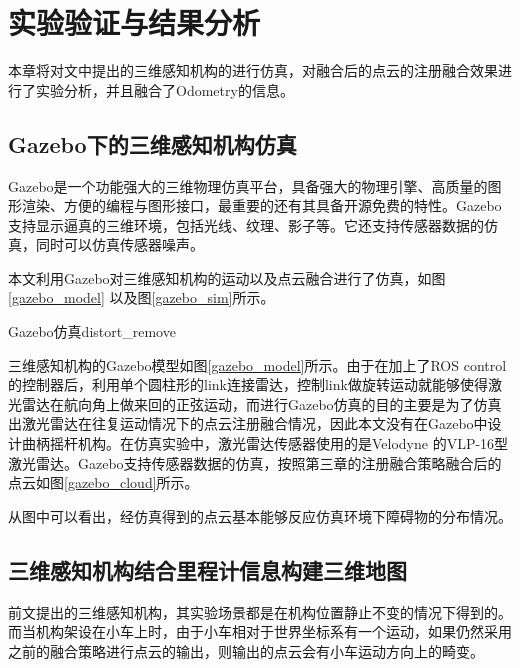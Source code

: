 
\chapter{实验验证与结果分析}
本章将对文中提出的三维感知机构的进行仿真，对融合后的点云的注册融合效果进行了实验分析，并且融合了Odometry的信息。

\section{Gazebo下的三维感知机构仿真}

Gazebo是一个功能强大的三维物理仿真平台，具备强大的物理引擎、高质量的图形渲染、方便的编程与图形接口，最重要的还有其具备开源免费的特性。Gazebo支持显示逼真的三维环境，包括光线、纹理、影子等。它还支持传感器数据的仿真，同时可以仿真传感器噪声。

本文利用Gazebo对三维感知机构的运动以及点云融合进行了仿真，如图\ref{gazebo_model} 以及图\ref{gazebo_sim}所示。

\begin{pics}[htbp]{Gazebo仿真}{distort_remove}
\end{pics}

三维感知机构的Gazebo模型如图\ref{gazebo_model}所示。由于在加上了ROS control的控制器后，利用单个圆柱形的link连接雷达，控制link做旋转运动就能够使得激光雷达在航向角上做来回的正弦运动，而进行Gazebo仿真的目的主要是为了仿真出激光雷达在往复运动情况下的点云注册融合情况，因此本文没有在Gazebo中设计曲柄摇杆机构。在仿真实验中，激光雷达传感器使用的是Velodyne 的VLP-16型激光雷达。Gazebo支持传感器数据的仿真，按照第三章的注册融合策略融合后的点云如图\ref{gazebo_cloud}所示。


从图中可以看出，经仿真得到的点云基本能够反应仿真环境下障碍物的分布情况。

\section{三维感知机构结合里程计信息构建三维地图}

前文提出的三维感知机构，其实验场景都是在机构位置静止不变的情况下得到的。而当机构架设在小车上时，由于小车相对于世界坐标系有一个运动，如果仍然采用之前的融合策略进行点云的输出，则输出的点云会有小车运动方向上的畸变。

